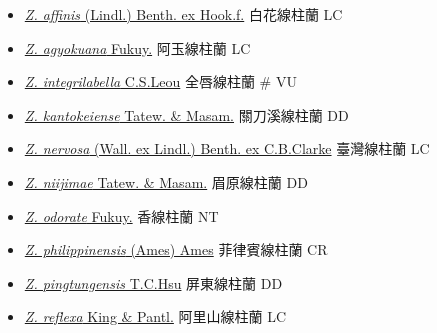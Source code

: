 \begin{itemize}
  \begin{itemize}
        \item[] \href{http://www.theplantlist.org/tpl1.1/search?q=Zeuxine+affinis}{\textit{Z. affinis} (Lindl.) Benth. ex Hook.f.}   白花線柱蘭   LC
        \item[] \href{http://www.theplantlist.org/tpl1.1/search?q=Zeuxine+agyokuana}{\textit{Z. agyokuana} Fukuy.}   阿玉線柱蘭   LC
        \item[] \href{http://www.theplantlist.org/tpl1.1/search?q=Zeuxine+integrilabella}{\textit{Z. integrilabella} C.S.Leou}   全唇線柱蘭  \# VU
        \item[] \href{http://www.theplantlist.org/tpl1.1/search?q=Zeuxine+kantokeiense}{\textit{Z. kantokeiense} Tatew. \& Masam.}   關刀溪線柱蘭   DD
        \item[] \href{http://www.theplantlist.org/tpl1.1/search?q=Zeuxine+nervosa}{\textit{Z. nervosa} (Wall. ex Lindl.) Benth. ex C.B.Clarke}   臺灣線柱蘭   LC
        \item[] \href{http://www.theplantlist.org/tpl1.1/search?q=Zeuxine+niijimae}{\textit{Z. niijimae} Tatew. \& Masam.}   眉原線柱蘭   DD
        \item[] \href{http://www.theplantlist.org/tpl1.1/search?q=Zeuxine+odorate}{\textit{Z. odorate} Fukuy.}   香線柱蘭   NT
        \item[] \href{http://www.theplantlist.org/tpl1.1/search?q=Zeuxine+philippinensis}{\textit{Z. philippinensis} (Ames) Ames}   菲律賓線柱蘭   CR
        \item[] \href{http://www.theplantlist.org/tpl1.1/search?q=Zeuxine+pingtungensis}{\textit{Z. pingtungensis} T.C.Hsu}   屏東線柱蘭   DD
        \item[] \href{http://www.theplantlist.org/tpl1.1/search?q=Zeuxine+reflexa}{\textit{Z. reflexa} King \& Pantl.}   阿里山線柱蘭   LC

\end{itemize}
\end{itemize}

